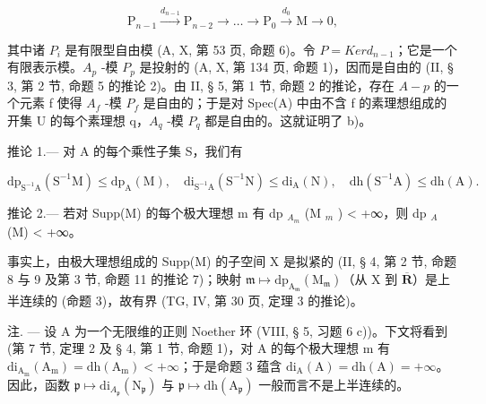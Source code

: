 \[
\mathrm{P} _ {n - 1} \stackrel {d _ {n - 1}} {\longrightarrow} \mathrm{P} _ {n - 2} \longrightarrow \dots \longrightarrow \mathrm{P} _ {0} \stackrel {d _ {0}} {\longrightarrow} \mathrm{M} \rightarrow 0,
\]

其中诸 \(P_{i}\) 是有限型自由模 (A, X, 第 53 页, 命题 6)。令 \(P = Ker d_{n-1}\)；它是一个有限表示模。\(A_{p}\) -模 \(P_{p}\) 是投射的 (A, X, 第 134 页, 命题 1)，因而是自由的 (II, § 3, 第 2 节, 命题 5 的推论 2)。由 II, § 5, 第 1 节, 命题 2 的推论，存在 \(A - p\) 的一个元素 f 使得 \(A_{f}\) -模 \(P_{f}\) 是自由的；于是对 Spec(A) 中由不含 f 的素理想组成的开集 U 的每个素理想 q，\(A_{q}\) -模 \(P_{q}\) 都是自由的。这就证明了 b)。

推论 1.--- 对 A 的每个乘性子集 S，我们有

\[
\mathrm{dp} _ {\mathrm{S} ^ {- 1} \mathrm{A}} (\mathrm{S} ^ {- 1} \mathrm{M}) \leqslant \mathrm{dp} _ {\mathrm{A}} (\mathrm{M}), \quad \mathrm{di} _ {\mathrm{S} ^ {- 1} \mathrm{A}} (\mathrm{S} ^ {- 1} \mathrm{N}) \leqslant \mathrm{di} _ {\mathrm{A}} (\mathrm{N}), \quad \mathrm{dh} (\mathrm{S} ^ {- 1} \mathrm{A}) \leqslant \mathrm{dh} (\mathrm{A}).
\]

推论 2.--- 若对 Supp(M) 的每个极大理想 m 有 dp \(_{A_m}\) (M \(_m\) ) \textless{} +∞，则 dp \(_A\) (M) \textless{} +∞。

事实上，由极大理想组成的 Supp(M) 的子空间 X 是拟紧的 (II, § 4, 第 2 节, 命题 8 与 9 及第 3 节, 命题 11 的推论 7)；映射 \(\mathfrak{m} \mapsto \mathrm{dp}_{\mathrm{A}_{\mathfrak{m}}}(\mathrm{M}_{\mathfrak{m}})\)（从 X 到 \(\overline{\mathbf{R}}\)）是上半连续的 (命题 3)，故有界 (TG, IV, 第 30 页, 定理 3 的推论)。

注. --- 设 A 为一个无限维的正则 Noether 环 (VIII, § 5, 习题 6 c))。下文将看到 (第 7 节, 定理 2 及 § 4, 第 1 节, 命题 1)，对 A 的每个极大理想 m 有 \(\mathrm{di}_{\mathrm{A_m}}(\mathrm{A_m}) = \mathrm{dh}(\mathrm{A_m}) < +\infty\)；于是命题 3 蕴含 \(\mathrm{di}_{\mathrm{A}}(\mathrm{A}) = \mathrm{dh}(\mathrm{A}) = +\infty\)。因此，函数 \(\mathfrak{p} \mapsto \mathrm{di}_{A_{\mathfrak{p}}}(\mathrm{N}_{\mathfrak{p}})\) 与 \(\mathfrak{p} \mapsto \mathrm{dh}(\mathrm{A}_{\mathfrak{p}})\) 一般而言不是上半连续的。

